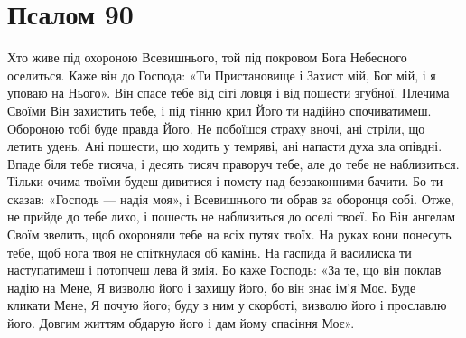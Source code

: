 \documentclass[chapters.tex]{subfiles}
\begin{document}
\section{Псалом 90}
Хто живе під охороною Всевишнього, той під покровом Бога Небесного оселиться. Каже він до Господа: «Ти Пристановище і Захист мій, Бог мій, і я уповаю на Нього». Він спасе тебе від сіті ловця і від пошести згубної. Плечима Своїми Він захистить тебе, і під тінню крил Його ти надійно спочиватимеш. Обороною тобі буде правда Його. Не побоїшся страху вночі, ані стріли, що летить удень. Ані пошести, що ходить у темряві, ані напасти духа зла опівдні. Впаде біля тебе тисяча, і десять тисяч праворуч тебе, але до тебе не наблизиться. Тільки очима твоїми будеш дивитися і помсту над беззаконними бачити. Бо ти сказав: «Господь — надія моя», і Всевишнього ти обрав за оборонця собі. Отже, не прийде до тебе лихо, і пошесть не наблизиться до оселі твоєї. Бо Він ангелам Своїм звелить, щоб охороняли тебе на всіх путях твоїх. На руках вони понесуть тебе, щоб нога твоя не спіткнулася об камінь. На гаспида й василиска ти наступатимеш і потопчеш лева й змія. Бо каже Господь: «За те, що він поклав надію на Мене, Я визволю його і захищу його, бо він знає ім’я Моє. Буде кликати Мене, Я почую його; буду з ним у скорботі, визволю його і прославлю його. Довгим життям обдарую його і дам йому спасіння Моє».
\end{document}
